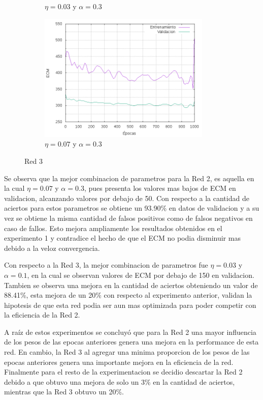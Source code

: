 \begin{figure}
\begin{subfigure}[b]{0.45\textwidth}
	  \caption{$\eta = 0.03 $ y $ \alpha = 0.3$}
	\end{subfigure}
	\begin{subfigure}[b]{0.45\textwidth}
	  \includegraphics[width=0.9\textwidth]{imagenes/ej1/ex_2-4_red_11-6-6-9-1_errors.png}
	  \caption{$\eta = 0.07 $ y $ \alpha = 0.3$}
	\end{subfigure}
	\caption{Red 3}
\end{figure}

Se observa que la mejor combinacion de parametros para la Red 2, es aquella en la cual $\eta = 0.07$ y $\alpha = 0.3$, pues presenta los valores
mas bajos de ECM en validacion, alcanzando valores por debajo de 50. Con respecto a la cantidad de aciertos para estos parametros se obtiene un
93.90\% en datos de validacion y a su vez se obtiene la misma cantidad de falsos positivos como de falsos negativos en caso de fallos.
 Esto mejora ampliamente los resultados obtenidos en el experimento 1 y contradice el hecho de que el ECM no podia disminuir mas debido a la veloz
 convergencia.

Con respecto a la Red 3, la mejor combinacion de parametros fue $\eta = 0.03$ y $\alpha = 0.1$, en la cual se observan valores de ECM por debajo de 150
en validacion. Tambien se observa una mejora en la cantidad de aciertos obteniendo un valor de 88.41\%, esta mejora de un 20\% con respecto al experimento
anterior, validan la hipotesis de que esta red podia ser aun mas optimizada para poder competir con la eficiencia de la Red 2.


A raíz de estos experimentos se concluyó que para la Red 2 una mayor influencia de los pesos de las epocas anteriores genera una mejora en la performance
de esta red. En cambio, la Red 3 al agregar una minima proporcion de los pesos de las epocas anteriores genera una importante mejora en la eficiencia
de la red.
Finalmente para el resto de la experimentacion se decidio descartar la Red 2 debido a que obtuvo una mejora de solo un 3\% en la cantidad de aciertos,
mientras que la Red 3 obtuvo un 20\%.

